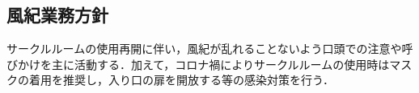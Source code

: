 \subsection*{風紀業務方針}

サークルルームの使用再開に伴い，風紀が乱れることないよう口頭での注意や呼びかけを主に活動する．加えて，コロナ禍によりサークルルームの使用時はマスクの着用を推奨し，入り口の扉を開放する等の感染対策を行う．

